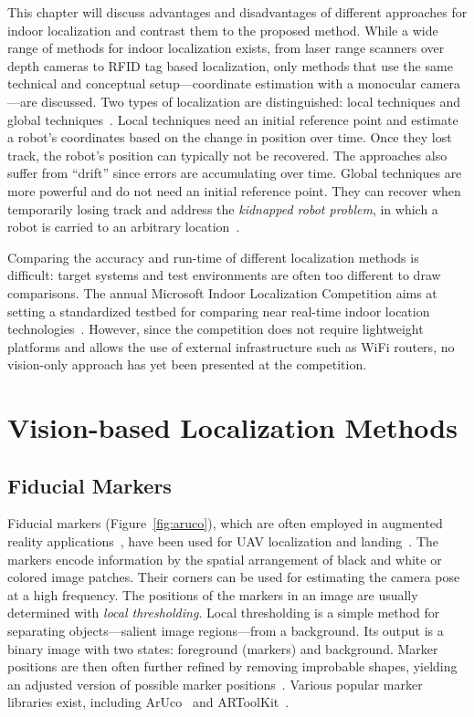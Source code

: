 \documentclass{report}
\begin{document}
This chapter will discuss advantages and disadvantages of different
approaches for indoor localization and contrast them to the proposed
method. While a wide range of methods for indoor localization exists,
from laser range scanners over depth cameras to RFID tag based
localization, only methods that use the same technical and conceptual
setup---coordinate estimation with a monocular camera---are
discussed. Two types of localization are distinguished: local
techniques and global techniques~\cite{fox1999monte}. Local techniques
need an initial reference point and estimate a robot's coordinates
based on the change in position over time. Once they lost track, the
robot's position can typically not be recovered. The approaches also
suffer from ``drift'' since errors are accumulating over time. Global
techniques are more powerful and do not need an initial reference
point. They can recover when temporarily losing track and address the
\emph{kidnapped robot problem}, in which a robot is carried to an
arbitrary location~\cite{engelson1992error}.

Comparing the accuracy and run-time of different localization methods
is difficult: target systems and test environments are often too
different to draw comparisons. The annual Microsoft Indoor
Localization Competition aims at setting a standardized testbed for
comparing near real-time indoor location
technologies~\cite{microsoft}. However, since the competition does not
require lightweight platforms and allows the use of external
infrastructure such as WiFi routers, no vision-only approach has yet
been presented at the competition.

\section{Vision-based Localization Methods}

\subsection{Fiducial Markers}
\label{sec:fiducialmarkers}

Fiducial markers (Figure~\ref{fig:aruco}), which are often employed in
augmented reality
applications~\cite{kato1999marker,garrido2014automatic}, have been
used for UAV localization and
landing~\cite{eberli2011vision,bebop2015}. The markers encode
information by the spatial arrangement of black and white or colored
image patches. Their corners can be used for estimating the camera
pose at a high frequency. The positions of the markers in an image are
usually determined with \emph{local thresholding}. Local thresholding
is a simple method for separating objects---salient image
regions---from a background. Its output is a binary image with two
states: foreground (markers) and background. Marker positions are then
often further refined by removing improbable shapes, yielding an
adjusted version of possible marker
positions~\cite{aruco2014}. Various popular marker libraries exist,
including ArUco~\cite{aruco2014} and ARToolKit~\cite{kato1999marker}.
\end{document}
